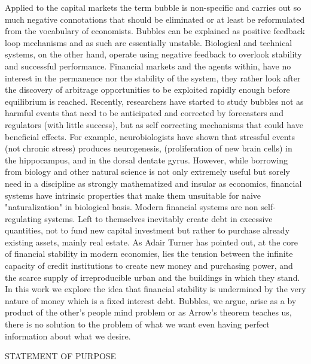 \documentclass[11pt, onecolumn]{article}
\begin{document}
Applied to the capital markets the term bubble is non-specific and carries out so much negative connotations that should be eliminated or at least be reformulated from the vocabulary of economists.  Bubbles can be explained as positive feedback loop mechanisms and as such are essentially unstable. 
Biological and technical systems, on the other hand, operate using negative feedback to overlook stability and successful performance. Financial markets and the agents within, have no interest in the permanence nor the stability of the system, they rather look after the discovery of arbitrage opportunities to be exploited rapidly enough before equilibrium is reached. 
Recently, researchers have started to study bubbles not as harmful events that need to be anticipated and corrected by forecasters and regulators (with little success), but as self correcting mechanisms that could have beneficial effects. For example, neurobiologists have shown that stressful events (not chronic stress) produces neurogenesis, (proliferation of new brain cells) in the hippocampus, and in the dorsal dentate gyrus.
However, while borrowing from biology and other natural science is not only extremely useful but sorely need in a discipline as strongly mathematized and insular as economics, financial systems have intrinsic properties that make them unsuitable for naive "naturalization" in biological basis. 
Modern financial systems are non self-regulating systems. Left to themselves inevitably create debt in excessive quantities, not to fund new capital investment but rather to purchase already existing assets, mainly real estate. 
As Adair Turner has pointed out, at the core of financial stability in modern economies, lies the tension between the infinite capacity of credit institutions to create new money and purchasing power, and the scarce supply of irreproducible urban and the buildings in which they stand.  
In this work we explore the idea that financial stability is undermined by the very nature of money which is a fixed interest debt. 
Bubbles, we argue, arise as a by product of the other's people mind problem or as Arrow's theorem teaches us, there is no solution to the problem of what we want even having perfect information about what we desire.


STATEMENT OF PURPOSE
\end{document}
